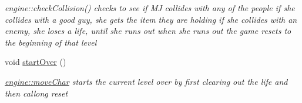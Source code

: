 \begin{DoxyCompactItemize}
\begin{DoxyCompactList}\small\item\em engine\-::check\-Collision() checks to see if M\-J collides with any of the people if she collides with a good guy, she gets the item they are holding if she collides with an enemy, she loses a life, until she runs out when she runs out the game resets to the beginning of that level \end{DoxyCompactList}\item 
\hypertarget{classengine_a6ffdddfa828e97da265f0483509f7554}{void \hyperlink{classengine_a6ffdddfa828e97da265f0483509f7554}{start\-Over} ()}\label{classengine_a6ffdddfa828e97da265f0483509f7554}

\begin{DoxyCompactList}\small\item\em \hyperlink{classengine_ac084e69968320aa57383fc251f54b887}{engine\-::move\-Char} starts the current level over by first clearing out the life and then callong reset \end{DoxyCompactList}\end{DoxyCompactItemize}
